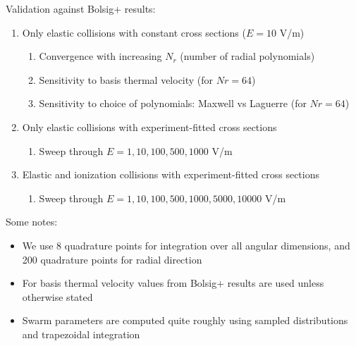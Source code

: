 \documentclass[mathserif, aspectratio=169]{beamer}
\begin{document}
\begin{frame}
Validation against Bolsig+ results:
\begin{enumerate}
\item Only elastic collisions with constant cross sections ($E=10$ V/m)
\begin{enumerate}
\item Convergence with increasing $N_r$ (number of radial polynomials)
\item Sensitivity to basis thermal velocity (for $Nr = 64$)
\item Sensitivity to choice of polynomials: Maxwell vs Laguerre (for $Nr = 64$)
\end{enumerate}
\item Only elastic collisions with experiment-fitted cross sections
\begin{enumerate}
\item Sweep through $E = 1, 10, 100, 500, 1000$ V/m
\end{enumerate}
\item Elastic and ionization collisions with experiment-fitted cross sections
\begin{enumerate}
\item Sweep through $E = 1, 10, 100, 500, 1000, 5000, 10000$ V/m
\end{enumerate}
\end{enumerate}


Some notes:
\begin{itemize}
\item We use 8 quadrature points for integration over all angular dimensions, and 200 quadrature points for radial direction
\item For basis thermal velocity values from Bolsig+ results are used unless otherwise stated
\item Swarm parameters are computed quite roughly using sampled distributions and trapezoidal integration
\end{itemize}
\end{frame}
\end{document}
